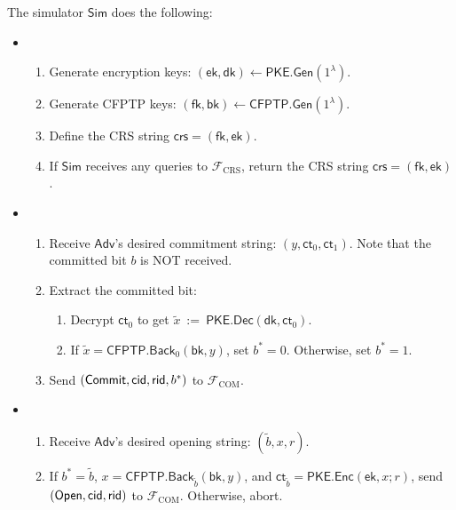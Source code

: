 \documentclass[11pt,letterpaper]{article}
\newcommand{\doclearpage}{%
  \iffull\clearpage\else\fi
}
\theoremstyle{plain} %
\theoremstyle{definition} %
\theoremstyle{remark} %
\newcommand{\eqdef}{\ {:=} \ }
\newcommand{\OpenMsg}{\mathsf{Open}}
\newcommand{\CommitMsg}{\mathsf{Commit}}
\newcommand{\Input}{x}
\newcommand{\SecParam}{\lambda}
\newcommand{\PKE}{\mathsf{PKE}}
\newcommand{\Gen}{\mathsf{Gen}}
\newcommand{\Enc}{\mathsf{Enc}}
\newcommand{\Dec}{\mathsf{Dec}}
\newcommand{\EncKey}{\mathsf{ek}}
\newcommand{\DecKey}{\mathsf{dk}}
\newcommand{\ExtBit}{b^*}
\newcommand{\AdvBit}{\Adv{b}}
\newcommand{\Ct}{\mathsf{ct}}
\newcommand{\Rand}{r}
\newcommand{\CFPTP}{\mathsf{CFPTP}}
\newcommand{\Back}{\mathsf{Back}}
\newcommand{\ForwKey}{\mathsf{fk}}
\newcommand{\BackKey}{\mathsf{bk}}
\newcommand{\Output}{y}
\newcommand{\Simulator}{{\mathsf{Sim}}} %
\newcommand{\Adversary}{{\mathsf{Adv}}} %
\newcommand{\Adv}[1]{\tilde{#1}} %
\newcommand{\IF}{\mathcal{F}} %
\newcommand{\IFCrs}{\IF_{\mathrm{CRS}}}
\newcommand{\crs}{\mathsf{crs}}
\newcommand{\IFCom}{\IF_{\mathrm{COM}}}
\newcommand{\CommBit}{b}
\begin{document}
The simulator $\Simulator$ does the following:
\begin{itemize}
\item \parhead{Simulate $\IFCrs$}
\begin{enumerate}[nolistsep]
    \item Generate encryption keys: $(\EncKey, \DecKey) \gets \PKE.\Gen(1^{\SecParam})$.
    \item Generate CFPTP keys: $(\ForwKey,\BackKey) \gets \CFPTP.\Gen(1^{\SecParam})$.
    \item Define the CRS string $\crs = (\ForwKey, \EncKey)$.
    \item If $\Simulator$ receives any queries to $\IFCrs$, return the CRS string $\crs = (\ForwKey, \EncKey)$.
\end{enumerate}

\item {}
\begin{enumerate}[nolistsep]
    \item Receive $\Adversary$'s desired commitment string: $(\Output, \Ct_0, \Ct_1)$. Note that the committed bit $\CommBit$ is NOT received.
    \item Extract the committed bit:
    \begin{enumerate}[nolistsep]
        \item Decrypt $\Ct_0$ to get $\tilde{\Input} \eqdef \PKE.\Dec(\DecKey, \Ct_0)$.
        \item If $\tilde{\Input} = \CFPTP.\Back_0(\BackKey, \Output)$, set $\ExtBit = 0$. Otherwise, set $\ExtBit = 1$.
    \end{enumerate}
    \item Send $(\CommitMsg, \CommitterId, \ReceiverId, \ExtBit)$ to $\IFCom$.
\end{enumerate}

\item {}
\begin{enumerate}[nolistsep]
    \item Receive $\Adversary$'s desired opening string: $(\AdvBit, \Input, \Rand)$.
	\item If $\ExtBit = \AdvBit$, $\Input = \CFPTP.\Back_{\AdvBit}(\BackKey, \Output)$, and $\Ct_{\AdvBit} = \PKE.\Enc(\EncKey, \Input; \Rand)$, send $(\OpenMsg, \CommitterId, \ReceiverId)$ to $\IFCom$. Otherwise, abort.
\end{enumerate}

\end{itemize}

\doclearpage
{\small{


}}
\end{document}
